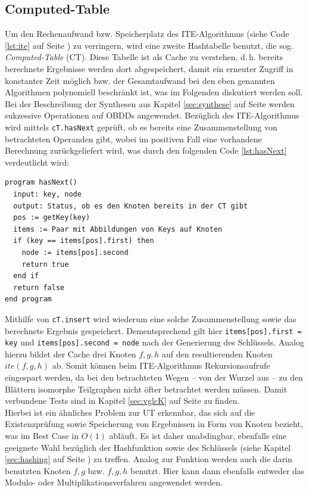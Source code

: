 \subsection{Computed-Table}
\label{sec:ctable}
Um den Rechenaufwand bzw. Speicherplatz des ITE-Algorithmus (siehe Code \ref{lst:ite} auf Seite \pageref{lst:ite}) zu verringern, wird eine zweite Hashtabelle benutzt, die sog. \emph{Computed-Table} (CT). Diese Tabelle ist als Cache zu verstehen, d.\,h. bereits berechnete Ergebnisse werden dort abgespeichert, damit ein erneuter Zugriff in konstanter Zeit möglich bzw. der Gesamtaufwand bei den eben genannten Algorithmen polynomiell beschränkt ist, was im Folgenden diskutiert werden soll.\\
Bei der Beschreibung der Synthesen aus Kapitel \ref{sec:synthese} auf Seite \pageref{sec:synthese} werden sukzessive Operationen auf OBDDs angewendet. Bezüglich des ITE-Algorithmus wird mittels \texttt{cT.hasNext} geprüft, ob es bereits eine Zusammenstellung von betrachteten Operanden gibt, wobei im positiven Fall eine vorhandene Berechnung zurückgeliefert wird, was durch den folgenden Code \ref{lst:hasNext} verdeutlicht wird:
\lstset{language=xml}
\begin{lstlisting}[frame=htrbl, caption={Implementierung von {\ttfamily hasNext}}, label={lst:hasNext}]
program hasNext()
  input: key, node
  output: Status, ob es den Knoten bereits in der CT gibt
  pos := getKey(key)
  items := Paar mit Abbildungen von Keys auf Knoten
  if (key == items[pos].first) then
    node := items[pos].second
    return true
  end if
  return false
end program
\end{lstlisting}
Mithilfe von \texttt{cT.insert} wird wiederum eine solche Zusammenstellung sowie das berechnete Ergebnis gespeichert. Dementsprechend gilt hier \texttt{items[pos].first = key} und \texttt{items[pos].second = node} nach der Generierung des Schlüssels. Analog hierzu bildet der Cache drei Knoten $f,g,h$ auf den resultierenden Knoten $ite(f,g,h)$ ab. Somit können beim ITE-Algorithmus Rekursionsaufrufe eingespart werden, da bei den betrachteten Wegen -- von der Wurzel aus -- zu den Blättern isomorphe Teilgraphen nicht öfter betrachtet werden müssen. Damit verbundene Tests sind in Kapitel \ref{sec:vglcK} auf Seite \pageref{sec:vglcK} zu finden.\\
Hierbei ist ein ähnliches Problem zur UT erkennbar, das sich auf die Existenzprüfung sowie Speicherung von Ergebnissen in Form von Knoten bezieht, was im Best Case in $O(1)$ abläuft. Es ist daher unabdingbar, ebenfalls eine geeignete Wahl bezüglich der Hashfunktion sowie des Schlüssels (siehe Kapitel \ref{sec:hashing} auf Seite \pageref{sec:hashing}) zu treffen. Analog zur Funktion werden auch die darin benutzten Knoten $f, g$ bzw. $f, g, h$ benutzt. Hier kann dann ebenfalls entweder das Modulo- oder Multiplikationsverfahren angewendet werden.\\
